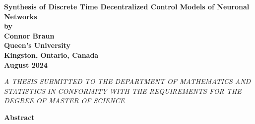 \documentclass[12pt, oneside]{report}
\newcommand{\1}[1]{\mathbbm{1}_{\{#1\}}}
\theoremstyle{definition}
\begin{document}
\begin{titlepage}
\vspace*{\fill}
\begin{center}
    {\bf\Large Synthesis of Discrete Time Decentralized Control Models of Neuronal Networks}\\[20pt]
    {\bf by}\\[20pt]
    {\bf Connor Braun}\\[60pt]
    {\bf Queen's University}\\[10pt]
    {\bf Kingston, Ontario, Canada}\\[10pt]
    {\bf August 2024}
\end{center}
\vspace*{\fill}
\begin{center}
    {\it A THESIS SUBMITTED TO THE DEPARTMENT OF MATHEMATICS AND STATISTICS IN
    CONFORMITY WITH THE REQUIREMENTS FOR THE DEGREE OF MASTER OF SCIENCE}
\end{center}
\end{titlepage}
\begin{center}
    {\bf\Large Abstract}
\end{center}
\end{document}
